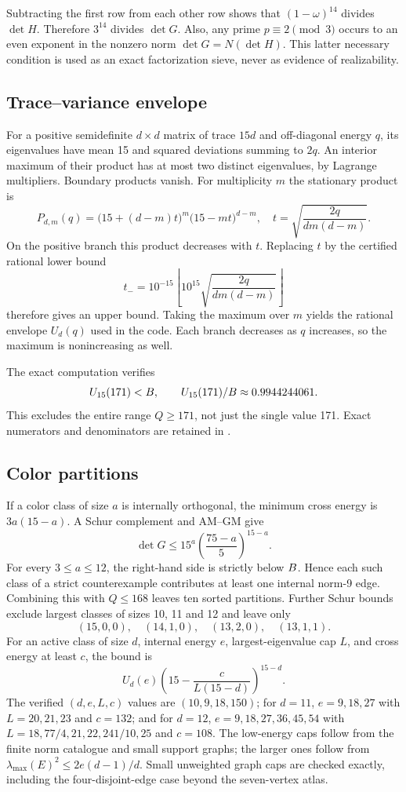 \documentclass[11pt,a4paper]{article}
\newcommand{\file}[1]{\path{#1}}
\begin{document}
Subtracting the first row from each other row shows that $(1-\omega)^{14}$ divides $\det H$. Therefore $3^{14}$ divides $\det G$. Also, any prime $p\equiv2\pmod3$ occurs to an even exponent in the nonzero norm $\det G=N(\det H)$. This latter necessary condition is used as an exact factorization sieve, never as evidence of realizability.

\subsection{Trace--variance envelope}
For a positive semidefinite $d\times d$ matrix of trace $15d$ and off-diagonal energy $q$, its eigenvalues have mean 15 and squared deviations summing to $2q$. An interior maximum of their product has at most two distinct eigenvalues, by Lagrange multipliers. Boundary products vanish. For multiplicity $m$ the stationary product is
\[
 P_{d,m}(q)=\bigl(15+(d-m)t\bigr)^m\bigl(15-mt\bigr)^{d-m},
 \quad t=\sqrt{\frac{2q}{dm(d-m)}}.
\]
On the positive branch this product decreases with $t$. Replacing $t$ by the certified rational lower bound
\[
 t_- =10^{-15}\left\lfloor10^{15}\sqrt{\frac{2q}{dm(d-m)}}\right\rfloor
\]
therefore gives an upper bound. Taking the maximum over $m$ yields the rational envelope $U_d(q)$ used in the code. Each branch decreases as $q$ increases, so the maximum is nonincreasing as well.

The exact computation verifies
\[
 U_{15}(171)<B,\qquad U_{15}(171)/B\approx0.9944244061.
\]
This excludes the entire range $Q\ge171$, not just the single value 171. Exact numerators and denominators are retained in \file{results/foundations.json}.

\subsection{Color partitions}
If a color class of size $a$ is internally orthogonal, the minimum cross energy is $3a(15-a)$. A Schur complement and AM--GM give
\[
 \det G\le15^a\left(\frac{75-a}{5}\right)^{15-a}.
\]
For every $3\le a\le12$, the right-hand side is strictly below $B$. Hence each such class of a strict counterexample contributes at least one internal norm-9 edge. Combining this with $Q\le168$ leaves ten sorted partitions. Further Schur bounds exclude largest classes of sizes 10, 11 and 12 and leave only
\[
 (15,0,0),\quad(14,1,0),\quad(13,2,0),\quad(13,1,1).
\]
For an active class of size $d$, internal energy $e$, largest-eigenvalue cap $L$, and cross energy at least $c$, the bound is
\[
 U_d(e)\left(15-\frac{c}{L(15-d)}\right)^{15-d}.
\]
The verified $(d,e,L,c)$ values are $(10,9,18,150)$; for $d=11$, $e=9,18,27$ with $L=20,21,23$ and $c=132$; and for $d=12$, $e=9,18,27,36,45,54$ with $L=18,77/4,21,22,241/10,25$ and $c=108$. The low-energy caps follow from the finite norm catalogue and small support graphs; the larger ones follow from $\lambda_{\max}(E)^2\le2e(d-1)/d$. Small unweighted graph caps are checked exactly, including the four-disjoint-edge case beyond the seven-vertex atlas.
\end{document}

